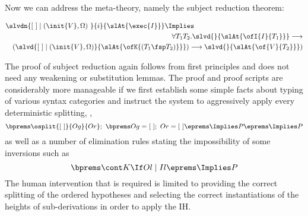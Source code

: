 \documentclass[final]{svjour3}
\begin{document}
\bigskip
Now we can address the meta-theory, namely the subject reduction
theorem:
\begin{goal}
\label{thm:sr}
\begin{eqnarray*}
\lefteqn{\slvdn{\elist\coln(\init{V},\Omega) \ }{i}{\slAt{\exec{I}}}
 \Implies}\\
& &  \forall
T_1T_2. \slvd{}{\slAt {\ofI{I}{T_1}}}\longrightarrow \\
& & 
(\slvd{\elist\coln(\init{V},\Omega) }{\slAt{\ofK{(T_1\fsp T_2)}}})
\longrightarrow\slvd{}{\slAt{\of{V}{T_2}}})
\end{eqnarray*}
\end{goal}
The proof of subject reduction again follows from first principles and
does not need any weakening or substitution lemmas. The proof and
proof scripts are considerably more manageable if we first establish
some simple facts about typing of various syntax categories and
instruct the system to aggressively apply every deterministic
splitting, \eg,
$$
 \bprems \osplit {\elist} {Og} {Or};\,\, \bprems Og = \elist;\,\,Or =
\elist\eprems \Implies P \eprems \Implies P
$$
as well as a number of elimination rules stating the impossibility of
some inversions such as
$$
\bprems\sbc{\cont K}{Ol}{Il} \eprems\Implies P
$$
The human intervention that is required is limited to providing the correct
splitting of
the ordered hypotheses and selecting the correct instantiations of the heights
of sub-derivations in order to apply the IH\@.
\end{document}
